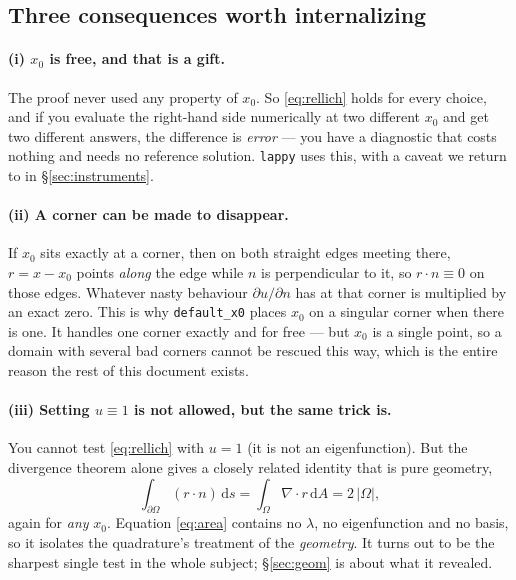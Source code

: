 \documentclass[11pt]{article}
\theoremstyle{definition}
\theoremstyle{remark}
\newcommand{\dd}{\,\mathrm{d}}
\newcommand{\Om}{\Omega}
\newcommand{\code}[1]{\texttt{#1}}
\begin{document}
\subsection{Three consequences worth internalizing}

\paragraph{(i) $x_0$ is free, and that is a gift.} The proof never used any
property of $x_0$. So \eqref{eq:rellich} holds for every choice, and if you
evaluate the right-hand side numerically at two different $x_0$ and get two
different answers, the difference is \emph{error} --- you have a diagnostic that
costs nothing and needs no reference solution. \code{lappy} uses this, with a
caveat we return to in \S\ref{sec:instruments}.

\paragraph{(ii) A corner can be made to disappear.} If $x_0$ sits exactly at a
corner, then on both straight edges meeting there, $r=x-x_0$ points \emph{along}
the edge while $n$ is perpendicular to it, so $r\cdot n\equiv0$ on those edges.
Whatever nasty behaviour $\partial u/\partial n$ has at that corner is multiplied
by an exact zero. This is why \code{default\_x0} places $x_0$ on a singular
corner when there is one. It handles one corner exactly and for free --- but
$x_0$ is a single point, so a domain with several bad corners cannot be rescued
this way, which is the entire reason the rest of this document exists.

\paragraph{(iii) Setting $u\equiv1$ is not allowed, but the same trick is.} You
cannot test \eqref{eq:rellich} with $u=1$ (it is not an eigenfunction). But the
divergence theorem alone gives a closely related identity that is pure geometry,
\begin{equation}\label{eq:area}
  \int_{\partial\Om}(r\cdot n)\dd s = \int_\Om \nabla\cdot r \dd A = 2\,|\Om| ,
\end{equation}
again for \emph{any} $x_0$. Equation \eqref{eq:area} contains no $\lambda$, no
eigenfunction and no basis, so it isolates the quadrature's treatment of the
\emph{geometry}. It turns out to be the sharpest single test in the whole
subject; \S\ref{sec:geom} is about what it revealed.
\end{document}
